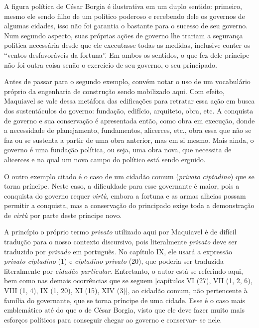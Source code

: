 A figura política de César Borgia é ilustrativa em um duplo sentido:
primeiro, mesmo ele sendo filho de um político poderoso e recebendo dele
os governos de algumas cidades, isso não foi garantia o bastante para o
sucesso de seu governo. Num segundo aspecto, suas próprias ações de
governo lhe trariam a segurança política necessária desde que ele
executasse todas as medidas, inclusive conter os ``ventos desfavoráveis
da fortuna''. Em ambos os sentidos, o que fez dele príncipe não foi
outra coisa senão o exercício de seu governo, o seu principado.

Antes de passar para o segundo exemplo, convém notar o uso de um
vocabulário próprio da engenharia de construção sendo mobilizado aqui.
Com efeito, Maquiavel se vale dessa metáfora das edificações para
retratar essa ação em busca dos sustentáculos do governo: fundação,
edifício, arquiteto, obra, etc. A conquista de governo e sua conservação
é apresentada então, como obra em execução, donde a necessidade de
planejamento, fundamentos, alicerces, etc., obra essa que não se faz ou
se sustenta a partir de uma obra anterior, mas em si mesmo. Mais ainda,
o governo é uma fundação política, ou seja, uma obra nova, que necessita
de alicerces e na qual um novo campo do político está sendo erguido.

O outro exemplo citado é o caso de um cidadão comum (\emph{privato
ciptadino}) que se torna príncipe. Neste caso, a dificuldade para esse
governante é maior, pois a conquista do governo requer \emph{virtù},
embora a fortuna e as armas alheias possam permitir a conquista, mas a
conservação do principado exige toda a demonstração de \emph{virtù} por
parte deste príncipe novo.

A princípio o próprio termo \emph{privato} utilizado aqui por Maquiavel
é de difícil tradução para o nosso contexto discursivo, pois
literalmente \emph{privato} deve ser traduzido por \emph{privado} em
português. No capítulo IX, ele usará a expressão \emph{privato
ciptadino} (1) e \emph{ciptadino privato} (20), que poderia ser
traduzida literalmente por \emph{cidadão particular}. Entretanto, o
autor está se referindo aqui, bem como nas demais ocorrências que se
seguem {[}capítulos VI (27), VII (1, 2, 6), VIII (1, 4), IX (1, 20), XI
(15), XIV (3){]}, ao cidadão comum, não pertencente à família do
governante, que se torna príncipe de uma cidade. Esse é o caso mais
emblemático até do que o de César Borgia, visto que ele deve fazer muito
mais esforços políticos para conseguir chegar ao governo e conservar- se
nele.

